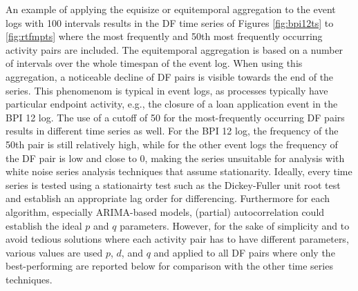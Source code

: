 An example of applying the equisize or equitemporal aggregation to the event logs with 100 intervals results in the DF time series of Figures \ref{fig:bpi12ts} to \ref{fig:rtfmpts} where the most frequently and 50th most frequently occurring activity pairs are included.
The equitemporal aggregation is based on a number of intervals over the whole timespan of the event log.
When using this aggregation, a noticeable decline of DF pairs is visible towards the end of the series.
This phenomenom is typical in event logs, as processes typically have particular endpoint activity, e.g., the closure of a loan application event in the BPI 12 log.
The use of a cutoff of 50 for the most-frequently occurring DF pairs results in different time series as well.
For the BPI 12 log, the frequency of the 50th pair is still relatively high, while for the other event logs the frequency of the DF pair is low and close to 0, making the series unsuitable for analysis with white noise series analysis techniques that assume stationarity.
Ideally, every time series is tested using a stationairty test such as the Dickey-Fuller unit root test \cite{leybourne1995testing} and establish an appropriate lag order for differencing. 
Furthermore for each algorithm, especially ARIMA-based models, (partial) autocorrelation could establish the ideal $p$ and $q$ parameters.
However, for the sake of simplicity and to avoid tedious solutions where each activity pair has to have different parameters, various values are used $p$, $d$, and $q$ and applied to all DF pairs where only the best-performing are reported below for comparison with the other time series techniques.

